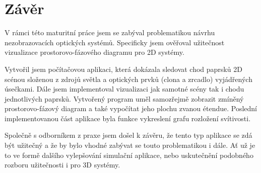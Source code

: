 \chapter{Závěr}

V rámci této maturitní práce jsem se zabýval problematikou návrhu nezobrazovacích optických systémů. Specificky jsem ověřoval užitečnost vizualizace prostorovo-fázového diagramu pro 2D systémy.

Vytvořil jsem počítačovou aplikaci, která dokázala sledovat chod paprsků 2D scénou složenou z zdrojů světla a optických prvků (clona a zrcadlo) vyjádřených úsečkami. Dále jsem implementoval vizualizaci jak samotné scény tak i chodu jednotlivých paprsků. Vytvořený program uměl samozřejmě zobrazit zmíněný prostorovo-fázový diagram a také vypočítat jeho plochu zvanou étendue. Poslední implementovanou část aplikace byla funkce vykreslení grafu rozložení svítivosti.

Společně s odborníkem z praxe jsem došel k závěru, že tento typ aplikace se zdá být užitečný a že by bylo vhodné zabývat se touto problematikou i dále. Ať už je to ve formě dalšího vylepšování simulační aplikace, nebo uskutečnění podobného rozboru užitečnosti i pro 3D systémy.
